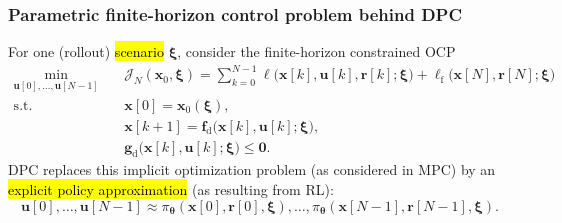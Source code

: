 \begin{frame}
	\frametitle{Parametric finite-horizon control problem behind DPC}
	For one (rollout) \hl{scenario} $\bm{\xi}$, consider the finite-horizon constrained OCP
	\begin{equation}
		\begin{aligned}
			\min_{\bm{u}[0],\ldots,\bm{u}[N-1]}\quad
			 & \mathcal{J}_{N}(\bm{x}_0,\bm{\xi})
			=\sum_{k=0}^{N-1}\ell\bigl(\bm{x}[k],\bm{u}[k],\bm{r}[k];\bm{\xi}\bigr)
			+\ell_{\mathrm{f}}\bigl(\bm{x}[N],\bm{r}[N];\bm{\xi}\bigr)                  \\
			\mathrm{s.t.}\quad
			 & \bm{x}[0]=\bm{x}_0(\bm{\xi}),                                            \\
			 & \bm{x}[k+1]=\bm{f}_{\mathrm{d}}\bigl(\bm{x}[k],\bm{u}[k];\bm{\xi}\bigr), \\
			 & \bm{g}_{\mathrm{d}}\bigl(\bm{x}[k],\bm{u}[k];\bm{\xi}\bigr)\leq\bm{0}.
		\end{aligned}
	\end{equation}\pause%
	DPC replaces this implicit optimization problem (as considered in MPC) by an \hl{explicit policy approximation} (as resulting from RL):
	\begin{equation}
		\boxed{\bm{u}[0],\ldots,\bm{u}[N-1]\approx \pi_{\bm{\theta}}(\bm{x}[0],\bm{r}[0],\bm{\xi}), \ldots, \pi_{\bm{\theta}}(\bm{x}[N-1],\bm{r}[N-1],\bm{\xi}).}
	\end{equation}
\end{frame}

